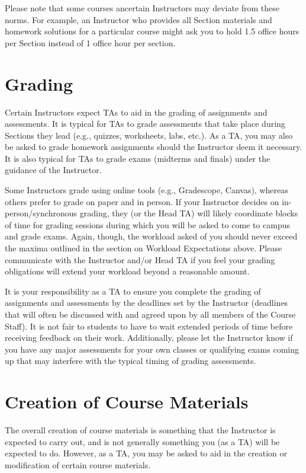 \documentclass[
  letterpaper,
  DIV=11,
  numbers=noendperiod]{scrreprt}
\begin{document}
Please note that some courses ancertain Instructors may deviate from
these norms. For example, an Instructor who provides all Section
materials and homework solutions for a particular course might ask you
to hold 1.5 office hours per Section instead of 1 office hour per
section.

\hypertarget{grading}{%
\chapter{Grading}\label{grading}}

Certain Instructors expect TAs to aid in the grading of assignments and
assessments. It is typical for TAs to grade assessments that take place
during Sections they lead (e.g., quizzes, worksheets, labs, etc.). As a
TA, you may also be asked to grade homework assignments should the
Instructor deem it necessary. It is also typical for TAs to grade exams
(midterms and finals) under the guidance of the Instructor.

Some Instructors grade using online tools (e.g., Gradescope, Canvas),
whereas others prefer to grade on paper and in person. If your
Instructor decides on in-person/synchronous grading, they (or the Head
TA) will likely coordinate blocks of time for grading sessions during
which you will be asked to come to campus and grade exams. Again,
though, the workload asked of you should never exceed the maxima
outlined in the section on Workload Expectations above. Please
communicate with the Instructor and/or Head TA if you feel your grading
obligations will extend your workload beyond a reasonable amount.

It is your responsibility as a TA to ensure you complete the grading of
assignments and assessments by the deadlines set by the Instructor
(deadlines that will often be discussed with and agreed upon by all
members of the Course Staff). It is not fair to students to have to wait
extended periods of time before receiving feedback on their work.
Additionally, please let the Instructor know if you have any major
assessments for your own classes or qualifying exams coming up that may
interfere with the typical timing of grading assessments.

\hypertarget{creation-of-course-materials}{%
\chapter{Creation of Course
Materials}\label{creation-of-course-materials}}

The overall creation of course materials is something that the
Instructor is expected to carry out, and is not generally something you
(as a TA) will be expected to do. However, as a TA, you may be asked to
aid in the creation or modification of certain course materials.
\end{document}
